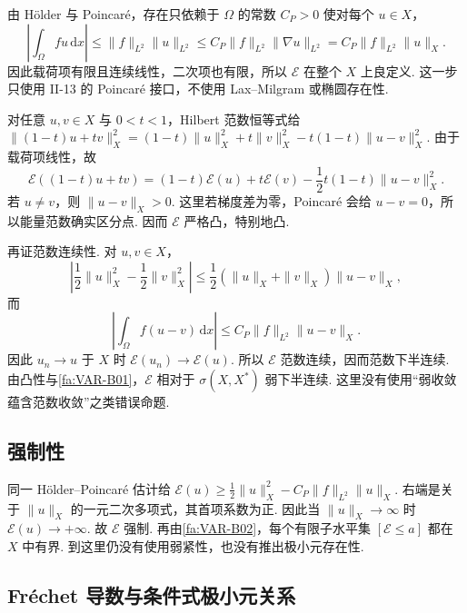 由 Hölder 与 Poincaré，存在只依赖于 \(\displaystyle\Omega\) 的常数 \(\displaystyle C_P>0\) 使对每个 \(\displaystyle u\in X\)，
\[
\left|\int_\Omega fu\,\mathrm{d}x\right|
\leqslant
\|f\|_{L^2}\|u\|_{L^2}
\leqslant
C_P\|f\|_{L^2}\|\nabla u\|_{L^2}
=
C_P\|f\|_{L^2}\|u\|_X.
\]
因此载荷项有限且连续线性，二次项也有限，所以 \(\displaystyle\mathcal E\) 在整个 \(\displaystyle X\) 上良定义. 这一步只使用 II-13 的 Poincaré 接口，不使用 Lax--Milgram 或椭圆存在性.

对任意 \(\displaystyle u,v\in X\) 与 \(\displaystyle0<t<1\)，Hilbert 范数恒等式给
\(\displaystyle \|(1-t)u+tv\|_X^2 = (1-t)\|u\|_X^2+t\|v\|_X^2 -t(1-t)\|u-v\|_X^2.\)
由于载荷项线性，故
\[
\mathcal E((1-t)u+tv)
=
(1-t)\mathcal E(u)+t\mathcal E(v)
-
\frac{1}{2}t(1-t)\|u-v\|_X^2.
\]
若 \(\displaystyle u\neq v\)，则 \(\displaystyle\|u-v\|_X>0\). 这里若梯度差为零，Poincaré 会给 \(\displaystyle u-v=0\)，所以能量范数确实区分点. 因而 \(\displaystyle\mathcal E\) 严格凸，特别地凸.

再证范数连续性. 对 \(\displaystyle u,v\in X\)，
\[
\left|
\frac{1}{2}\|u\|_X^2-
\frac{1}{2}\|v\|_X^2
\right|
\leqslant
\frac{1}{2}(\|u\|_X+\|v\|_X)\|u-v\|_X,
\]
而
\[
\left|\int_\Omega f(u-v)\,\mathrm{d}x\right|
\leqslant
C_P\|f\|_{L^2}\|u-v\|_X.
\]
因此 \(\displaystyle u_n\to u\) 于 \(\displaystyle X\) 时 \(\displaystyle\mathcal E(u_n)\to\mathcal E(u)\). 所以 \(\displaystyle\mathcal E\) 范数连续，因而范数下半连续. 由凸性与\autoref{fa:VAR-B01}，\(\displaystyle\mathcal E\) 相对于 \(\displaystyle\sigma(X,X^*)\) 弱下半连续. 这里没有使用“弱收敛蕴含范数收敛”之类错误命题.

\subsection{强制性}

同一 Hölder--Poincaré 估计给
\(\displaystyle \mathcal E(u) \geqslant \frac{1}{2}\|u\|_X^2 - C_P\|f\|_{L^2}\|u\|_X.\)
右端是关于 \(\displaystyle\|u\|_X\) 的一元二次多项式，其首项系数为正. 因此当 \(\displaystyle\|u\|_X\to\infty\) 时
\(\displaystyle \mathcal E(u)\to+\infty.\)
故 \(\displaystyle\mathcal E\) 强制. 再由\autoref{fa:VAR-B02}，每个有限子水平集 \(\displaystyle[\mathcal E\leqslant a]\) 都在 \(\displaystyle X\) 中有界. 到这里仍没有使用弱紧性，也没有推出极小元存在性.

\subsection{Fréchet 导数与条件式极小元关系}

